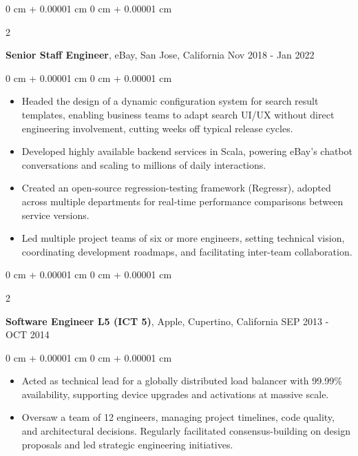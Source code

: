 \documentclass[10pt, letterpaper]{article}
\newenvironment{highlights}{
    \begin{itemize}[
        topsep=0.10 cm,
        parsep=0.10 cm,
        partopsep=0pt,
        itemsep=0pt,
        leftmargin=0 cm + 10pt
    ]
}{
    \end{itemize}
} %
\newenvironment{onecolentry}{
    \begin{adjustwidth}{
        0 cm + 0.00001 cm
    }{
        0 cm + 0.00001 cm
    }
}{
    \end{adjustwidth}
} %
\newenvironment{twocolentry}[2][]{
    \onecolentry
    \def\secondColumn{#2}
    \setcolumnwidth{\fill, 4.5 cm}
    \begin{paracol}{2}
}{
    \switchcolumn \raggedleft \secondColumn
    \end{paracol}
    \endonecolentry
} %
\begin{document}
        \vspace{0.15 cm}
        \begin{twocolentry}{
            Nov 2018 - Jan 2022
        }
            \textbf{Senior Staff Engineer}, eBay, San Jose, California\end{twocolentry}
        \vspace{0.10 cm}
        \begin{onecolentry}
            \begin{highlights}
                \item Headed the design of a dynamic configuration system for search result templates, enabling business teams to adapt search UI/UX without direct engineering involvement, cutting weeks off typical release cycles.
                \item Developed highly available backend services in Scala, powering eBay's chatbot conversations and scaling to millions of daily interactions.
                \item Created an open-source regression-testing framework (Regressr), adopted across multiple departments for real-time performance comparisons between service versions.
                \item Led multiple project teams of six or more engineers, setting technical vision, coordinating development roadmaps, and facilitating inter-team collaboration.
            \end{highlights}
        \end{onecolentry}

        \vspace{0.15 cm}
        \begin{twocolentry}{
            SEP 2013 - OCT 2014
        }
            \textbf{Software Engineer L5 (ICT 5)}, Apple, Cupertino, California\end{twocolentry}
        \vspace{0.10 cm}
        \begin{onecolentry}
            \begin{highlights}
                \item Acted as technical lead for a globally distributed load balancer with 99.99\% availability, supporting device upgrades and activations at massive scale.
                \item Oversaw a team of 12 engineers, managing project timelines, code quality, and architectural decisions. Regularly facilitated consensus-building on design proposals and led strategic engineering initiatives.
            \end{highlights}
        \end{onecolentry}
\end{document}
